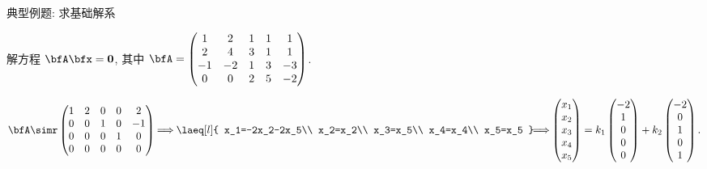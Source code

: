 \begin{frame}{典型例题: 求基础解系}
	\onslide<+->
	\begin{exercise}
		解方程 $\bfA\bfx={\bf0}$, 其中 $\bfA=\begin{pmatrix}
			1&2&1&1&1\\
			2&4&3&1&1\\
			-1&-2&1&3&-3\\
			0&0&2&5&-2
		\end{pmatrix}$.
	\end{exercise}
	\onslide<+->
	\begin{answer}
		\[\bfA\simr\begin{pmatrix}
			1&2&0&0&2\\
			0&0&1&0&-1\\
			0&0&0&1&0\\
			0&0&0&0&0
		\end{pmatrix}\!\!\implies\!\!
		\laeq[l]{
			x_1=-2x_2-2x_5\\
			x_2=x_2\\
			x_3=x_5\\
			x_4=x_4\\
			x_5=x_5
		}\!\!\!\!\implies\!\!\begin{pmatrix}
			x_1\\x_2\\x_3\\x_4\\x_5
		\end{pmatrix}=k_1\begin{pmatrix}
			-2\\1\\0\\0\\0
		\end{pmatrix}+k_2\begin{pmatrix}
			-2\\0\\1\\0\\1
		\end{pmatrix}.\]
	\end{answer}
\end{frame}


